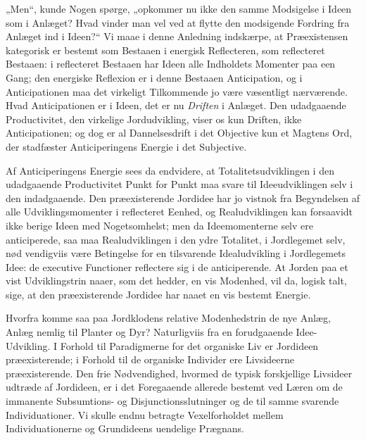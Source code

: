 \documentclass[12pt]{book}
\newcommand{\opage}[1]{\marginnote{\footnotesize\textit{[#1]}}}
\begin{document}
„Men“, kunde Nogen spørge, „opkommer nu ikke den samme Modsigelse i Ideen som i Anlæget? Hvad vinder man vel ved at flytte den modsigende Fordring fra Anlæget ind i Ideen?“ Vi maae i denne Anledning indskærpe, at Præexistensen kategorisk er bestemt som Bestaaen i energisk Reflecteren, som reflecteret Bestaaen: i reflecteret Bestaaen har Ideen alle Indholdets Momenter paa een Gang; den energiske Reflexion er i denne Bestaaen Anticipation, og i Anticipationen maa det virkeligt Tilkommende jo være væsentligt nærværende. Hvad Anticipationen er i Ideen, det er nu \emph{Driften} i Anlæget. Den udadgaaende Productivitet, den virkelige Jordudvikling, viser os kun Driften, ikke Anticipationen; og dog er al Dannelsesdrift i det Objective kun et Magtens Ord, der stadfæster Anticiperingens Energie i det Subjective.

Af Anticiperingens Energie sees da endvidere, at Totalitetsudviklingen i den udadgaaende Productivitet Punkt for Punkt maa svare til Ideeudviklingen selv i den indadgaaende. Den præexisterende Jordidee har jo vistnok fra Begyndelsen af alle Udviklingsmomenter i reflecteret Eenhed, og Realudviklingen kan forsaavidt ikke berige Ideen med Nogetsomhelst; men da Ideemomenterne selv ere anticiperede, saa maa Realudviklingen i den ydre Totalitet, i Jordlegemet selv, nød%
\opage{446}vendigviis være Betingelse for en tilsvarende Idealudvikling i Jordlegemets Idee: de executive Functioner reflectere sig i de anticiperende. At Jorden paa et vist Udviklingstrin naaer, som det hedder, en vis Modenhed, vil da, logisk talt, sige, at den præexisterende Jordidee har naaet en vis bestemt Energie.

Hvorfra komme saa paa Jordklodens relative Modenhedstrin de nye Anlæg, Anlæg nemlig til Planter og Dyr? Naturligviis fra en forudgaaende Idee-Udvikling. I Forhold til Paradigmerne for det organiske Liv er Jordideen præexisterende; i Forhold til de organiske Individer ere Livsideerne præexisterende. Den frie Nødvendighed, hvormed de typisk forskjellige Livsideer udtræde af Jordideen, er i det Foregaaende allerede bestemt ved Læren om de immanente Subsumtions- og Disjunctionsslutninger og de til samme svarende Individuationer. Vi skulle endnu betragte Vexelforholdet mellem Individuationerne og Grundideens uendelige Prægnans.
\end{document}
